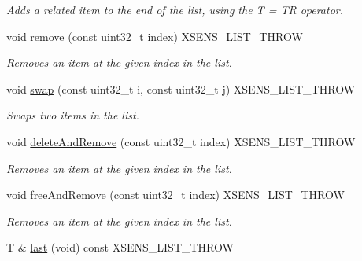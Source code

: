 \begin{DoxyCompactItemize}
\begin{DoxyCompactList}\small\item\em \-Adds a related item to the end of the list, using the \-T = \-T\-R operator. \end{DoxyCompactList}\item 
\hypertarget{classxsens_1_1List_ad2148d383c607b5dba21682a3fd37119}{void \hyperlink{classxsens_1_1List_ad2148d383c607b5dba21682a3fd37119}{remove} (const uint32\-\_\-t index) \-X\-S\-E\-N\-S\-\_\-\-L\-I\-S\-T\-\_\-\-T\-H\-R\-O\-W}\label{classxsens_1_1List_ad2148d383c607b5dba21682a3fd37119}

\begin{DoxyCompactList}\small\item\em \-Removes an item at the given index in the list. \end{DoxyCompactList}\item 
\hypertarget{classxsens_1_1List_a77370ae25853be59aaae0eb71e1c1b29}{void \hyperlink{classxsens_1_1List_a77370ae25853be59aaae0eb71e1c1b29}{swap} (const uint32\-\_\-t i, const uint32\-\_\-t j) \-X\-S\-E\-N\-S\-\_\-\-L\-I\-S\-T\-\_\-\-T\-H\-R\-O\-W}\label{classxsens_1_1List_a77370ae25853be59aaae0eb71e1c1b29}

\begin{DoxyCompactList}\small\item\em \-Swaps two items in the list. \end{DoxyCompactList}\item 
\hypertarget{classxsens_1_1List_a3362937154d51b6c2ff69b9ef24986c3}{void \hyperlink{classxsens_1_1List_a3362937154d51b6c2ff69b9ef24986c3}{delete\-And\-Remove} (const uint32\-\_\-t index) \-X\-S\-E\-N\-S\-\_\-\-L\-I\-S\-T\-\_\-\-T\-H\-R\-O\-W}\label{classxsens_1_1List_a3362937154d51b6c2ff69b9ef24986c3}

\begin{DoxyCompactList}\small\item\em \-Removes an item at the given index in the list. \end{DoxyCompactList}\item 
\hypertarget{classxsens_1_1List_a4a63907d16f742460c1793f33c06c650}{void \hyperlink{classxsens_1_1List_a4a63907d16f742460c1793f33c06c650}{free\-And\-Remove} (const uint32\-\_\-t index) \-X\-S\-E\-N\-S\-\_\-\-L\-I\-S\-T\-\_\-\-T\-H\-R\-O\-W}\label{classxsens_1_1List_a4a63907d16f742460c1793f33c06c650}

\begin{DoxyCompactList}\small\item\em \-Removes an item at the given index in the list. \end{DoxyCompactList}\item 
\hypertarget{classxsens_1_1List_a2c51c41cde25cd7ae079ea8bdfc9aab3}{\-T \& \hyperlink{classxsens_1_1List_a2c51c41cde25cd7ae079ea8bdfc9aab3}{last} (void) const \-X\-S\-E\-N\-S\-\_\-\-L\-I\-S\-T\-\_\-\-T\-H\-R\-O\-W}\label{classxsens_1_1List_a2c51c41cde25cd7ae079ea8bdfc9aab3}


\end{DoxyCompactItemize}
